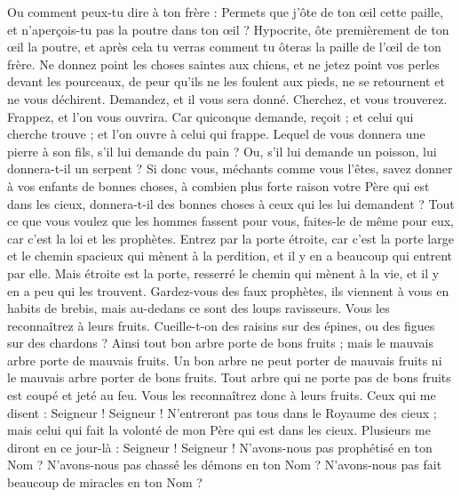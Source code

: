 \begin{multicols}{2}
Ou comment peux-tu dire à ton frère : Permets que j'ôte de ton œil cette paille, et n'aperçois-tu pas la poutre dans ton œil ?
Hypocrite, ôte premièrement de ton œil la poutre, et après cela tu verras comment tu ôteras la paille de l'œil de ton frère.
Ne donnez point les choses saintes aux chiens, et ne jetez point vos perles devant les pourceaux, de peur qu'ils ne les foulent aux pieds, ne se retournent et ne vous déchirent.
Demandez, et il vous sera donné. Cherchez, et vous trouverez. Frappez, et l'on vous ouvrira.
Car quiconque demande, reçoit ; et celui qui cherche trouve ; et l'on ouvre à celui qui frappe.
Lequel de vous donnera une pierre à son fils, s'il lui demande du pain ?
Ou, s'il lui demande un poisson, lui donnera-t-il un serpent ?
Si donc vous, méchants comme vous l'êtes, savez donner à vos enfants de bonnes choses, à combien plus forte raison votre Père qui est dans les cieux, donnera-t-il des bonnes choses à ceux qui les lui demandent ?
Tout ce que vous voulez que les hommes fassent pour vous, faites-le de même pour eux, car c'est la loi et les prophètes.
Entrez par la porte étroite, car c'est la porte large et le chemin spacieux qui mènent à la perdition, et il y en a beaucoup qui entrent par elle.
Mais étroite est la porte, resserré le chemin qui mènent à la vie, et il y en a peu qui les trouvent.
Gardez-vous des faux prophètes, ils viennent à vous en habits de brebis, mais au-dedans ce sont des loups ravisseurs.
Vous les reconnaîtrez à leurs fruits. Cueille-t-on des raisins sur des épines, ou des figues sur des chardons ?
Ainsi tout bon arbre porte de bons fruits ; mais le mauvais arbre porte de mauvais fruits.
Un bon arbre ne peut porter de mauvais fruits ni le mauvais arbre porter de bons fruits.
Tout arbre qui ne porte pas de bons fruits est coupé et jeté au feu.
Vous les reconnaîtrez donc à leurs fruits.
Ceux qui me disent : Seigneur ! Seigneur ! N'entreront pas tous dans le Royaume des cieux ; mais celui qui fait la volonté de mon Père qui est dans les cieux.
Plusieurs me diront en ce jour-là : Seigneur ! Seigneur ! N'avons-nous pas prophétisé en ton Nom ? N'avons-nous pas chassé les démons en ton Nom ? N'avons-nous pas fait beaucoup de miracles en ton Nom ?

\end{multicols}
